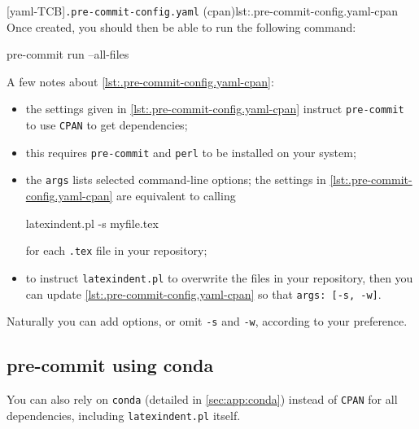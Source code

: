   [yaml-TCB]{\texttt{.pre-commit-config.yaml} (cpan)}{lst:.pre-commit-config.yaml-cpan}
  Once created, you should then be able to run the following command:
  \begin{commandshell}
pre-commit run --all-files  
\end{commandshell}
  A few notes about \cref{lst:.pre-commit-config.yaml-cpan}:
  \begin{itemize}
   \item the settings given in \cref{lst:.pre-commit-config.yaml-cpan} instruct
         \texttt{pre-commit} to use \texttt{CPAN} to get dependencies;
   \item this requires \texttt{pre-commit} and \texttt{perl} to be installed on your system;
   \item the \texttt{args} lists selected command-line options; the settings in
         \cref{lst:.pre-commit-config.yaml-cpan} are equivalent to calling
         \begin{commandshell}
latexindent.pl -s myfile.tex       
\end{commandshell}
         for each \texttt{.tex} file in your repository;
   \item to instruct \texttt{latexindent.pl} to overwrite the files in your repository, then you
         can update \cref{lst:.pre-commit-config.yaml-cpan} so that \texttt{args: [-s, -w]}.
  \end{itemize}

  Naturally you can add options, or omit \texttt{-s} and \texttt{-w}, according to your
  preference.

 \subsection{pre-commit using conda}\label{sec:pre-commit-conda}

  You can also rely on \texttt{conda} (detailed in \cref{sec:app:conda}) instead of
  \texttt{CPAN} for all dependencies, including \texttt{latexindent.pl} itself.
    

